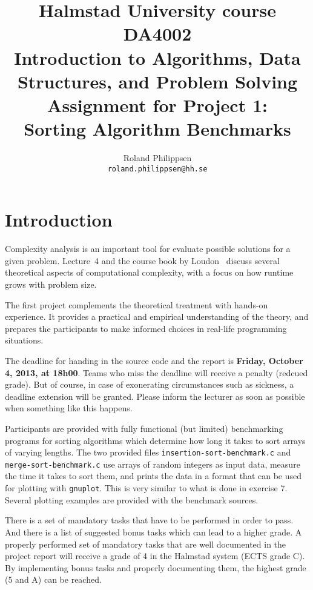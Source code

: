 \documentclass[a4paper,10pt]{article}
\begin{document}
\title{
  {\small
    Halmstad University course DA4002\\
    Introduction to Algorithms, Data Structures, and Problem Solving\\
  }
  Assignment for Project 1:\\
  Sorting Algorithm Benchmarks
}
\author{
  Roland Philippsen\\
  \texttt{roland.philippsen@hh.se}
}
\maketitle



\section*{Introduction}

Complexity analysis is an important tool for evaluate possible solutions for a given problem.
Lecture~4 and the course book by Loudon~\cite{loudon} discuss several theoretical aspects of computational complexity, with a focus on how runtime grows with problem size.

The first project complements the theoretical treatment with hands-on experience.
It provides a practical and empirical understanding of the theory, and prepares the participants to make informed choices in real-life programming situations.

The deadline for handing in the source code and the report is \textbf{Friday, October 4, 2013, at 18h00}.
Teams who miss the deadline will receive a penalty (redcued grade).
But of course, in case of exonerating circumstances such as sickness, a deadline extension will be granted.
Please inform the lecturer as soon as possible when something like this happens.

Participants are provided with fully functional (but limited) benchmarking programs for sorting algorithms which determine how long it takes to sort arrays of varying lengths.
The two provided files \texttt{insertion-sort-benchmark.c} and \texttt{merge\--sort\--benchmark.c} use arrays of random integers as input data, measure the time it takes to sort them, and prints the data in a format that can be used for plotting with \texttt{gnuplot}.
This is very similar to what is done in exercise 7.
Several plotting examples are provided with the benchmark sources.

There is a set of mandatory tasks that have to be performed in order to pass.
And there is a list of suggested bonus tasks which can lead to a higher grade.
A properly performed set of mandatory tasks that are well documented in the project report will receive a grade of 4 in the Halmstad system (ECTS grade C).
By implementing bonus tasks and properly documenting them, the highest grade (5 and A) can be reached.
\end{document}
